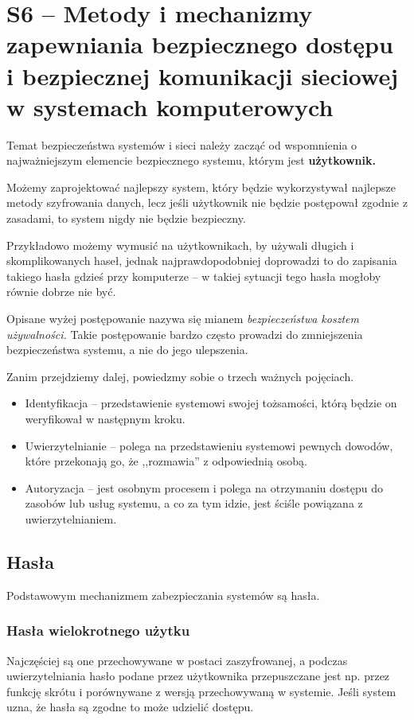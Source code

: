 \section{S6 -- Metody i mechanizmy zapewniania bezpiecznego dostępu i bezpiecznej komunikacji sieciowej w systemach komputerowych}

Temat bezpieczeństwa systemów i sieci należy zacząć od wspomnienia o najważniejszym elemencie bezpiecznego systemu, którym jest \textbf{użytkownik.}

Możemy zaprojektować najlepszy system, który będzie wykorzystywał najlepsze metody szyfrowania danych, lecz jeśli użytkownik nie będzie postępował zgodnie z zasadami, to system nigdy nie będzie bezpieczny.

Przykładowo możemy wymusić na użytkownikach, by używali długich i skomplikowanych haseł, jednak najprawdopodobniej doprowadzi to do zapisania takiego hasła gdzieś przy komputerze -- w takiej sytuacji tego hasła mogłoby równie dobrze nie być.

Opisane wyżej postępowanie nazywa się mianem \textit{bezpieczeństwa kosztem używalności.}
Takie postępowanie bardzo często prowadzi do zmniejszenia bezpieczeństwa systemu, a nie do jego ulepszenia.

Zanim przejdziemy dalej, powiedzmy sobie o trzech ważnych pojęciach.

\begin{itemize}
	\item{Identyfikacja -- przedstawienie systemowi swojej tożsamości, którą będzie on weryfikował w następnym kroku.}
	\item{Uwierzytelnianie -- polega na przedstawieniu systemowi pewnych dowodów, które przekonają go, że ,,rozmawia'' z odpowiednią osobą.}
	\item{Autoryzacja -- jest osobnym procesem i polega na otrzymaniu dostępu do zasobów lub usług systemu, a co za tym idzie, jest ściśle powiązana z uwierzytelnianiem.}
\end{itemize}

\subsection{Hasła}

Podstawowym mechanizmem zabezpieczania systemów są hasła.

\subsubsection{Hasła wielokrotnego użytku}
Najczęściej są one przechowywane w postaci zaszyfrowanej, a podczas uwierzytelniania hasło podane przez użytkownika przepuszczane jest np. przez funkcję skrótu i porównywane z wersją przechowywaną w systemie.
Jeśli system uzna, że hasła są zgodne to może udzielić dostępu.

